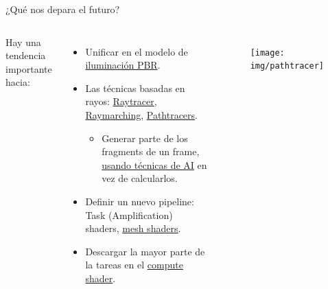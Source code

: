 \begin{frame}{¿Qué nos depara el futuro?}
\begin{columns}
    Hay una tendencia importante hacia:
    \begin{itemize}
        \item Unificar en el modelo de \href{https://en.wikipedia.org/wiki/Physically_based_rendering}{iluminación PBR}.
        \item Las técnicas basadas en rayos: \href{https://en.wikipedia.org/wiki/Ray_tracing_(graphics)}{Raytracer}, \href{https://en.wikipedia.org/wiki/Ray_marching}{Raymarching}, \href{https://en.wikipedia.org/wiki/Path_tracing}{Pathtracers}.
        \begin{itemize}
            \item Generar parte de los fragments de un frame, \href{https://www.youtube.com/watch?v=5PHBXY0FI5o&t=2s}{usando técnicas de AI} en vez de calcularlos.
        \end{itemize}
        \item Definir un nuevo pipeline: Task (Amplification) shaders, \href{https://www.khronos.org/blog/mesh-shading-for-vulkan}{mesh shaders}.
        \item Descargar la mayor parte de la tareas en el \href{https://en.wikipedia.org/wiki/Compute_kernel}{compute shader}.
    \end{itemize}
\begin{figure}[htp]
  \centering
  \texttt{[image: img/pathtracer]}
\end{figure}
\end{columns}
\end{frame}

